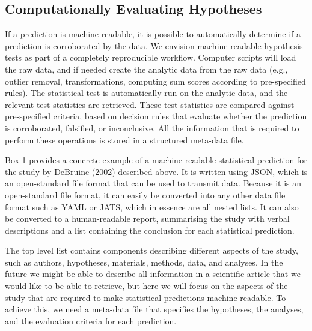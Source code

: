 \documentclass[english,doc,floatsintext]{apa6}
\begin{document}
\hypertarget{computationally-evaluating-hypotheses}{%
\subsection{Computationally Evaluating Hypotheses}\label{computationally-evaluating-hypotheses}}

If a prediction is machine readable, it is possible to automatically determine if a prediction is corroborated by the data. We envision machine readable hypothesis tests as part of a completely reproducible workflow. Computer scripts will load the raw data, and if needed create the analytic data from the raw data (e.g., outlier removal, transformations, computing sum scores according to pre-specified rules). The statistical test is automatically run on the analytic data, and the relevant test statistics are retrieved. These test statistics are compared against pre-specified criteria, based on decision rules that evaluate whether the prediction is corroborated, falsified, or inconclusive. All the information that is required to perform these operations is stored in a structured meta-data file.

Box 1 provides a concrete example of a machine-readable statistical prediction for the study by DeBruine (2002) described above. It is written using JSON, which is an open-standard file format that can be used to transmit data. Because it is an open-standard file format, it can easily be converted into any other data file format such as YAML or JATS, which in essence are all nested lists. It can also be converted to a human-readable report, summarising the study with verbal descriptions and a list containing the conclusion for each statistical prediction.

The top level list contains components describing different aspects of the study, such as authors, hypotheses, materials, methods, data, and analyses. In the future we might be able to describe all information in a scientific article that we would like to be able to retrieve, but here we will focus on the aspects of the study that are required to make statistical predictions machine readable. To achieve this, we need a meta-data file that specifies the hypotheses, the analyses, and the evaluation criteria for each prediction.
\end{document}
